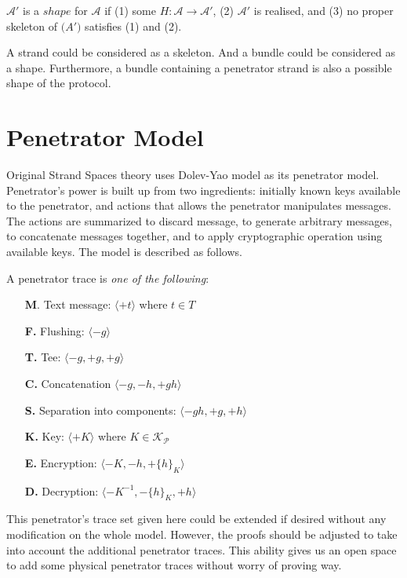 \begin{Definition}[Shape] $\mathcal{A}'$ is a $shape$ for $\mathcal{A}$ if (1) some $H : \mathcal{A} \rightarrow \mathcal{A'}$, (2) $\mathcal{A'}$ is realised, and (3) no proper skeleton of $\mathcal(A')$ satisfies (1) and (2). 
\end{Definition}

A strand could be considered as a skeleton. And a bundle could be considered as a shape. Furthermore, a bundle containing a penetrator strand is also a possible shape of the protocol. 

\section{Penetrator Model}

Original Strand Spaces theory uses Dolev-Yao \cite{dolev-yao} model as its penetrator model. Penetrator's power is built up from two ingredients: initially known keys available to the penetrator, and actions that allows the penetrator manipulates messages. The actions are summarized to discard message, to generate arbitrary messages, to concatenate messages together, and to apply cryptographic operation using available keys. The model is described as follows. 

\begin{Definition} A penetrator trace is \emph{one of the following}:
\begin{itemize}
\item[\textbf{M}.] Text message: $\langle+t\rangle$ where $t \in T$
\item[\textbf{F.}] Flushing: $\langle-g\rangle$ 
\item[\textbf{T.}] Tee: $\langle-g,+g,+g\rangle$
\item[\textbf{C.}] Concatenation $\langle-g,-h,+gh\rangle$
\item[\textbf{S.}] Separation into components: $\langle-gh,+g,+h\rangle$
\item[\textbf{K.}] Key: $\langle+K\rangle$ where $K \in \mathcal{K_P}$
\item[\textbf{E.}] Encryption: $\langle-K,-h,+\{h\}_K\rangle$
\item[\textbf{D.}] Decryption: $\langle-K^{-1},-\{h\}_K,+h\rangle$
\end{itemize} 
\end{Definition}

This penetrator's trace set given here could be extended if desired without any modification on the whole model. However, the proofs should be adjusted to take into account the additional penetrator traces. This ability gives us an open space to add some physical penetrator traces without worry of proving way. 


